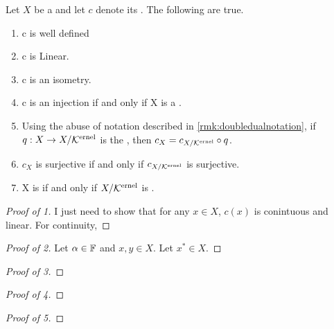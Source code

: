 \begin{prop}
\label{prop:canonicalembedding}
    Let $X$ be a \SeminormedSpace 
    and let $c$ denote its 
    \CanonicalEmbedding. 
    The following are true. 
    \begin{enumerate}
        \item c is well defined
        \item c is Linear. 
        \item c is an isometry. 
        \item c is an injection if and only if X is a \NormedSpace. 
        \item Using the abuse of notation described in 
        \ref{rmk:doubledualnotation}, 
        if $q:X \to X/\bf\mathcal{K}\rm^{ernel}$ is the \QuotientMap, 
        then $c_X=c_{X/\bf\mathcal{K}\rm^{ernel}} \circ q$. 
        \item $c_X$ is surjective if and only if 
        $c_{X/\bf\mathcal{K}\rm^{ernel}}$ is surjective. 
        \item X is \Reflexive if and only if $X/\bf\mathcal{K}\rm^{ernel}$ is \Reflexive.
    \end{enumerate}
    \begin{proof}[Proof of 1]
        I just need to show that for any 
        $x \in X$, $c(x)$ is
        conintuous and
        linear. 
        For continuity,
    \end{proof}
    \begin{proof}[Proof of 2]
        Let $\alpha \in \mathbb{F}$ and $x,y \in X$.
        Let $x^* \in X$. 
    \end{proof}
    \begin{proof}[Proof of 3]
    \end{proof}
    \begin{proof}[Proof of 4]
    \end{proof}
    \begin{proof}[Proof of 5]
    \end{proof}

\end{prop}

